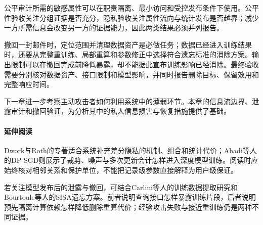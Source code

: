 公平审计所需的敏感属性可以在职责隔离、最小访问和受控发布条件下使用。公平性验收关注分组证据是否充分，隐私验收关注属性流向与统计发布是否越界；减少一方所需信息会改变另一方的证据能力，因此两类结果必须并列报告。

撤回一封邮件时，定位范围并清理数据资产是必做任务；数据已经进入训练结果时，还要从完整重训练、局部重算和参数修正中选择符合遗忘标准的消除方案。输出限制可以在撤回完成前降低暴露，却不能据此宣布训练影响已经消除。最终验收需要分别核对数据资产、接口限制和模型影响，并同时报告删除目标、保留效用和完整响应时间。

下一章进一步考察主动攻击者如何利用系统中的薄弱环节。本章的信息流边界、泄露审计和撤回验证，为分析其中的私人信息损害与恢复措施提供了基础。

\paragraph{延伸阅读}

Dwork与Roth的专著适合系统补充差分隐私的机制、组合和统计代价；Abadi等人的DP-SGD则展示了裁剪、噪声与多次更新会计怎样进入深度模型训练。阅读时应始终核对相邻关系和保护单位，不能把记录级参数直接解释为用户级保证。

若关注模型发布后的泄露与撤回，可结合Carlini等人的训练数据提取研究和Bourtoule等人的SISA遗忘方案。前者说明查询接口怎样暴露训练片段，后者说明预先隔离计算依赖怎样降低删除重算代价；经验攻击失败与接近重训练仍是两种不同证据。
